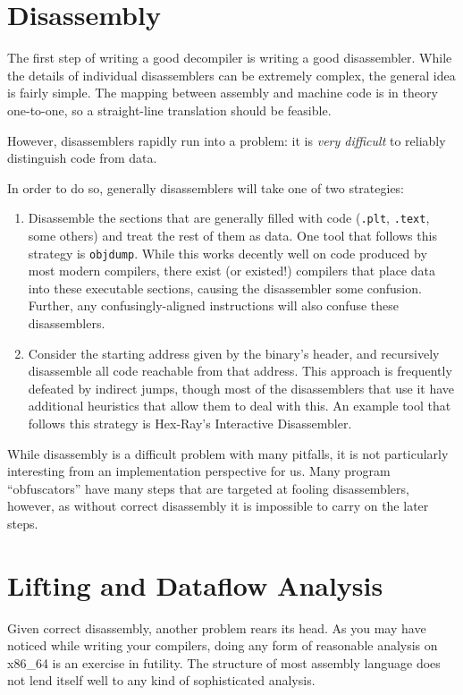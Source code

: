 \documentclass{article}
\begin{document}
\section{Disassembly}
The first step of writing a good decompiler is writing a good disassembler. While the
details of individual disassemblers can be extremely complex, the general idea is 
fairly simple. The mapping between assembly and machine code is in theory one-to-one,
so a straight-line translation should be feasible.

However, disassemblers rapidly run into a problem: it is {\em very difficult}
to reliably distinguish code from data.

In order to do so, generally disassemblers will take one of two strategies:
\begin{enumerate}
\item Disassemble the sections that are generally filled with code (\verb+.plt+, \verb+.text+,
some others) and treat the rest of them as data. One tool that follows this strategy is 
\verb+objdump+. While this works decently well on code produced by most modern compilers,
there exist (or existed!) compilers that place data into these executable sections, causing
the disassembler some confusion. Further, any confusingly-aligned instructions will also
confuse these disassemblers.
\item Consider the starting address given by the binary's header, and recursively disassemble
all code reachable from that address. This approach is frequently defeated by indirect jumps,
though most of the disassemblers that use it have additional heuristics that allow them to
deal with this. An example tool that follows this strategy is Hex-Ray's Interactive Disassembler.
\end{enumerate}

While disassembly is a difficult problem with many pitfalls, it is not particularly interesting
from an implementation perspective for us. Many program ``obfuscators'' have many steps that
are targeted at fooling disassemblers, however, as without correct disassembly it is impossible
to carry on the later steps.
\section{Lifting and Dataflow Analysis}
Given correct disassembly, another problem rears its head. As you may have noticed while
writing your compilers, doing any form of reasonable analysis on x86\_64 is an exercise
in futility. The structure of most assembly language does not lend itself well to any kind
of sophisticated analysis.
\end{document}
